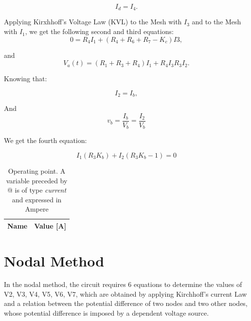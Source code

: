 \begin{equation}
  I_d = I_4.
  \label{eq:kvl}
\end{equation}

Applying Kirxhhoff's Voltage Law (KVL) to the Mesh with $I_3$ and to the Mesh with $I_1$, we get the following second and third equations:
\begin{equation}
  0 = R_4I_1 + (R_4 + R_6 + R_7-K_c)I3,
\end{equation}

and
\begin{equation}
  V_a(t) = (R_1 + R_3 + R_4)I_1 + R_4I_3 R_3I_2.
  \label{eq:kvl2}
\end{equation}

Knowing that:

\begin{equation}
  I_2 = I_b,
  \label{eq:vo_sol}
\end{equation}

And
\begin{equation}
  v_b = \frac{I_b}{V_b} = \frac{I_2}{V_b}
  \label{eq:vo_nat}
\end{equation}

We get the fourth equation:

\begin{equation}
  I_1(R_3K_b) + I_2(R_3K_b -1) = 0 
\end{equation}

\begin{table}[h]
  \centering
  \begin{tabular}{|l|r|}
    \hline    
    {\bf Name} & {\bf Value [A]} \\ \hline
    
  \end{tabular}
  \caption{Operating point. A variable preceded by @ is of type {\em current}
    and expressed in Ampere}
  \label{tab:op}
\end{table}

\section{Nodal Method}\label{sec:frequency-response}

In the nodal method, the circuit requires 6 equations to determine the values of V2, V3, V4, V5, V6, V7, which are obtained by applying Kirchhoff's current Law and a relation between the potential difference of two nodes and two other nodes, whose potential difference is imposed by a dependent voltage source. 

